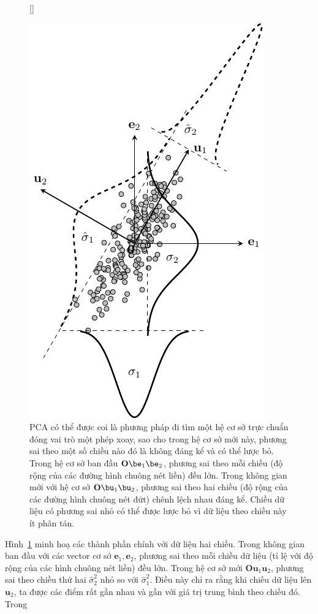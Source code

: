 \begin{figure}[t]


    [\FBwidth]
    {\caption{ PCA có thể được coi là phương pháp đi tìm một hệ cơ sở trực chuẩn
            đóng vai trò một phép xoay, sao cho trong hệ cơ sở mới này, phương sai theo
            một số chiều nào đó là không đáng kể và có thể lược bỏ. Trong hệ cơ sở ban đầu
            $\mathbf{O}\be_1\be_2$, phương sai theo mỗi chiều (độ rộng của các đường
            hình chuông nét liền) đều lớn. Trong không gian mới với hệ cơ sở
            $\mathbf{O}\bu_1\bu_2$, phương sai theo hai chiều (độ rộng của các đường
            hình chuông nét đứt) chênh lệch nhau đáng kể. Chiều dữ liệu có phương sai nhỏ
            có thể được lược bỏ vì dữ liệu theo chiều này ít phân tán. }
        \label{fig:27_4}}
    { %

        \includegraphics[width=.4\textwidth]{Chapters/content/27_pca/latex/pca_var.pdf}
    }
\end{figure}
Hình~\ref{fig:27_4} minh hoạ các thành phần chính với dữ liệu hai chiều.
Trong không gian ban đầu với các vector cơ sở $\mathbf{e}_1,
    \mathbf{e}_2$, phương sai theo mỗi chiều dữ liệu (tỉ lệ với độ rộng của các hình chuông
nét liền) đều lớn. Trong hệ cơ sở mới $\mathbf{O}\mathbf{u}_1\mathbf{u}_2$,
phương sai theo chiều thứ hai $\hat{\sigma}_2^2$ nhỏ so với
$\hat{\sigma}_1^2$. Điều này chỉ ra rằng khi chiếu dữ liệu lên $\mathbf{u}_2$, ta
được các điểm rất gần nhau và gần với giá trị trung bình theo chiều đó. Trong
